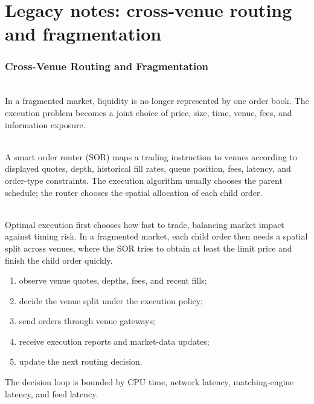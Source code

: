 \documentclass[a4paper,oneside,openany]{book}
\begin{document}
\chapter*{Legacy notes: cross-venue routing and fragmentation}

\subsection*{Cross-Venue Routing and Fragmentation}

\begin{principle} \\
In a fragmented market, liquidity is no longer represented by one order book. The execution problem becomes a joint choice of price, size, time, venue, fees, and information exposure.
\end{principle}

\begin{definition} \\
A smart order router (SOR) maps a trading instruction to venues according to displayed quotes, depth, historical fill rates, queue position, fees, latency, and order-type constraints. The execution algorithm usually chooses the parent schedule; the router chooses the spatial allocation of each child order.
\end{definition}

\begin{principle} \\
Optimal execution first chooses how fast to trade, balancing market impact against timing risk. In a fragmented market, each child order then needs a spatial split across venues, where the SOR tries to obtain at least the limit price and finish the child order quickly.
\end{principle}

\begin{process} 
\begin{enumerate}[label=\roman*.]
\setlength{\itemsep}{0pt}
\item observe venue quotes, depths, fees, and recent fills;
\item decide the venue split under the execution policy;
\item send orders through venue gateways;
\item receive execution reports and market-data updates;
\item update the next routing decision.
\end{enumerate}
The decision loop is bounded by CPU time, network latency, matching-engine latency, and feed latency.
\end{process}
\end{document}
